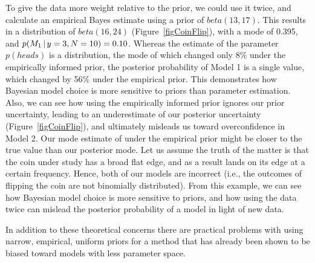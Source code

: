 To give the data more weight relative to the prior, we could use it twice, and
calculate an empirical Bayes estimate using a prior of $beta(13,17)$.  This
results in a distribution of $beta(16, 24)$ (Figure~\ref{figCoinFlip}), with a
mode of 0.395, and $p(M_1 \,|\, y=3, N=10) = 0.10$.
Whereas the estimate of the parameter $p(heads)$ is a distribution, the mode of
which changed only 8\% under the empirically informed prior, the posterior
probability of Model 1 is a single value, which changed by 56\% under the
empirical prior.
This demonstrates how Bayesian model choice is more sensitive to priors than
parameter estimation.
Also, we can see how using the empirically informed prior ignores our prior
uncertainty, leading to an underestimate of our posterior uncertainty
(Figure~\ref{figCoinFlip}), and ultimately misleads us toward overconfidence in
Model 2.
Our mode estimate of \myTheta{} under the empirical prior might be closer
to the true value than our posterior mode.
Let us assume the truth of the matter is that the coin under study has a broad
flat edge, and as a result lands on its edge at a certain frequency.
Hence, both of our models are incorrect (i.e., the outcomes of flipping the
coin are not binomially distributed).
From this example, we can see how Bayesian model choice is more sensitive to
priors, and how using the data twice can mislead the posterior probability of a
model in light of new data.

In addition to these theoretical concerns there are practical problems with
using narrow, empirical, uniform priors for a method that has already been
shown to be biased toward models with less parameter space.


